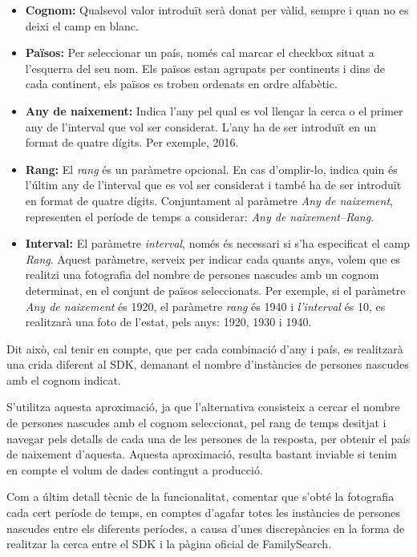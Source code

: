     \begin{itemize}
        \item \textbf{Cognom:} Qualsevol valor introduït serà donat per vàlid, sempre i quan no es deixi el camp en blanc.
        \item \textbf{Països:} Per seleccionar un país, només cal marcar el checkbox situat a l’esque\-rra del seu nom. Els països estan agrupats per continents i dins de cada continent, els països es troben ordenats en ordre alfabètic.
        \item \textbf{Any de naixement:} Indica l'any pel qual es vol llençar la cerca o el primer any de l’interval que vol ser considerat. L'any ha de ser introduït en un format de quatre dígits. Per exemple, 2016.
        \item \textbf{Rang:} El \emph{rang} és un paràmetre opcional. En cas d’omplir-lo, indica quin és l'últim any de l’interval que es vol ser considerat i també ha de ser introduït en format de quatre dígits. Conjuntament al paràmetre \emph{Any de naixement}, representen el període de temps a considerar: \emph{Any de naixement--Rang}.
        \item \textbf{Interval:} El paràmetre \emph{interval}, només és necessari si s'ha especificat el camp \emph{Rang}. Aquest paràmetre, serveix per indicar cada quants anys, volem que es realitzi una fotografia del nombre de persones nascudes amb un cognom determinat, en el conjunt de països seleccionats. Per exemple, si el paràmetre \emph{Any de naixement} és 1920, el paràmetre \emph{rang} és 1940 i \emph{l’interval} és 10, es realitzarà una foto de l'estat, pels anys: 1920, 1930 i 1940.
    \end{itemize}

    Dit això, cal tenir en compte, que per cada combinació d'any i país, es realitzarà una crida diferent al SDK, demanant el nombre d'instàncies de persones nascudes amb el cognom indicat.

    S'utilitza aquesta aproximació, ja que l'alternativa consisteix a cercar el nombre de persones nascudes amb el cognom seleccionat, pel rang de temps desitjat i navegar pels detalls de cada una de les persones de la resposta, per obtenir el país de naixement d’aquesta. Aquesta aproximació, resulta bastant inviable si tenim en compte el volum de dades contingut a producció.

    Com a últim detall tècnic de la funcionalitat, comentar que s'obté la fotografia cada cert període de temps, en comptes d'agafar totes les instàncies de persones nascudes entre els diferents períodes, a causa d’unes discrepàncies en la forma de realitzar la cerca entre el SDK i la pàgina oficial de FamilySearch.

